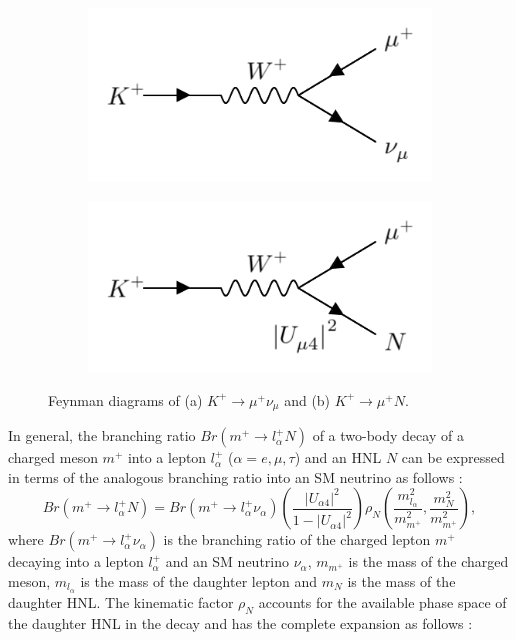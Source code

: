 \begin{figure}[ht!]
\begin{subfigure}[h]{0.4\linewidth}
\centering    
\includegraphics[width=\linewidth]{K_to_nu}
\caption{}
\label{fig:kaonnu}
\end{subfigure}
\hfill
\begin{subfigure}[h]{0.4\linewidth}
\centering    
\includegraphics[width=\linewidth]{K_to_HNL}
\caption{}
\label{fig:kaonhnl}
\end{subfigure}%
\caption[Neutrino and Heavy Neutral Lepton Production Feynman Diagrams]
{
	Feynman diagrams of (a) $K^+ \rightarrow \mu^+ \nu_{\mu}$ and (b) $K^+ \rightarrow \mu^+ N$.%
}
\end{figure}

In general, the branching ratio $Br(m^+\rightarrow l^{+}_{\alpha}N)$ of a two-body decay of a charged meson $m^+$ into a lepton $l^{+}_{\alpha}$ ($\alpha=e,\mu,\tau$) and an HNL $N$ can be expressed in terms of the analogous branching ratio into an SM neutrino as follows \cite{HNLKelly}:
\begin{equation}
	\label{eq:kaon_decay_hnl}
	Br(m^+\rightarrow l^{+}_{\alpha}N) = Br(m^+\rightarrow l^{+}_{\alpha}\nu_{\alpha})\left(\frac{|U_{\alpha 4}|^{2}}{1 - |U_{\alpha 4}|^{2}}\right)\rho_{N}\left(\frac{m^{2}_{l_{\alpha}}}{m^{2}_{m^+}}, \frac{m^{2}_{N}}{m^{2}_{m^+}} \right),
\end{equation}
where $Br(m^+\rightarrow l^{+}_{\alpha}\nu_{\alpha})$ is the branching ratio of the charged lepton $m^+$ decaying into a lepton $l^+_{\alpha}$ and an SM neutrino $\nu_{\alpha}$, $m_{m^+}$ is the mass of the charged meson, $m_{l_{\alpha}}$ is the mass of the daughter lepton and $m_{N}$ is the mass of the daughter HNL.
The kinematic factor $\rho_{N}$ accounts for the available phase space of the daughter HNL in the decay and has the complete expansion as follows \cite{HNLKelly}:

